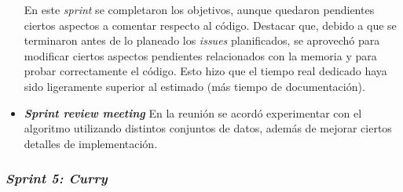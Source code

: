 \begin{itemize}
	En este \textit{sprint} se completaron los objetivos, aunque quedaron pendientes ciertos aspectos a comentar respecto al código. Destacar que, debido a que se terminaron antes de lo planeado los \textit{issues} planificados, se aprovechó para modificar ciertos aspectos pendientes relacionados con la memoria y para probar correctamente el código. Esto hizo que el tiempo real dedicado haya sido ligeramente superior al estimado (más tiempo de documentación).
	
	\item \textbf{\textit{Sprint review meeting}}
	En la reunión se acordó experimentar con el algoritmo utilizando distintos conjuntos de datos, además de mejorar ciertos detalles de implementación.
	
\end{itemize}

\subsubsection{\textit{Sprint 5: Curry}}

